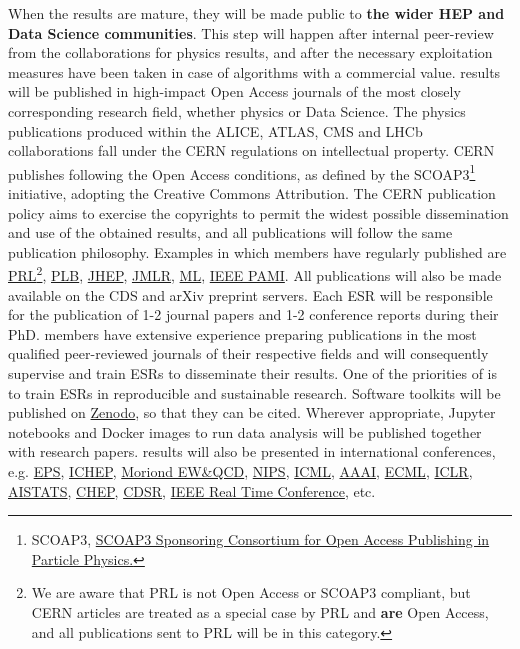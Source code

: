 When the results are mature, they will be made public to \textbf{the wider HEP and Data Science communities}. 
This step will happen after internal peer-review from the collaborations for physics results, and after the necessary exploitation measures have been taken in case of algorithms with a commercial value. 
\acronym results will be published in high-impact Open Access journals of the most closely corresponding research field, 
whether physics or Data Science. 
The physics publications produced within the ALICE, ATLAS, CMS and LHCb collaborations fall under the CERN regulations on intellectual
property. CERN publishes following the Open Access conditions, as defined by the SCOAP3\footnote{SCOAP3, \href{http://scoap3.org/}{SCOAP3 Sponsoring Consortium for Open Access Publishing in Particle Physics.}} initiative, adopting the Creative Commons Attribution. 
The CERN publication policy aims to exercise the copyrights to permit the widest possible dissemination and use of the obtained results, and all \acronym publications will follow the same publication philosophy.
Examples in which \acronym members have regularly published are \href{http://journals.aps.org/prl/}{PRL}\footnote{We are aware that PRL is not Open Access or SCOAP3  compliant, but CERN articles are treated as a special case by PRL and \textbf{are} Open Access, and all \acronym publications sent to PRL will be in this category.},  
\href{http://www.journals.elsevier.com/physics-letters-b/}{PLB}, 
\href{http://jhep.sissa.it}{JHEP}, 
\href{http://jmlr.csail.mit.edu}{JMLR}, 
\href{http://www.springer.com/computer/ai/journal/10994}{ML}, 
\href{http://www.computer.org/web/tpami}{IEEE PAMI}.
All publications will also be made available on the CDS and arXiv preprint servers. 
Each ESR will be responsible for the publication of 1-2 journal papers and 1-2 conference reports during their PhD. 
\acronym members have extensive experience preparing publications in the most qualified peer-reviewed journals of their respective fields and will consequently supervise and train
ESRs to disseminate their results.  
One of the priorities of \acronym is to train ESRs in reproducible and sustainable research. 
Software toolkits will be published on \href{www.zenodo.org}{Zenodo}, so that they can be cited. 
Wherever appropriate, Jupyter notebooks and Docker images to run data analysis will be published together with research papers. 
\acronym results will also be presented in international conferences, e.g.
\href{https://indico.cern.ch/event/577856/}{EPS},
\href{http://www.ichep2018.org}{ICHEP},
\href{http://moriond.in2p3.fr}{Moriond  EW\&QCD},
\href{http://nips.cc}{NIPS}, \href{http://icml.cc}{ICML}, \href{http://www.aaai.org/Conferences/IAAI/iaai15.php}{AAAI}, \href{http://www.ecmlpkdd2014.org}{ECML},
\href{https://sites.google.com/site/representationlearning2014/}{ICLR}, \href{http://www.aistats.org}{AISTATS}, \href{http://chep2018.org}{CHEP}, \href{http://cdsr.net/papers/}{CDSR}, 
\href{https://indico.cern.ch/event/543031/}{IEEE Real Time Conference}, etc. 

